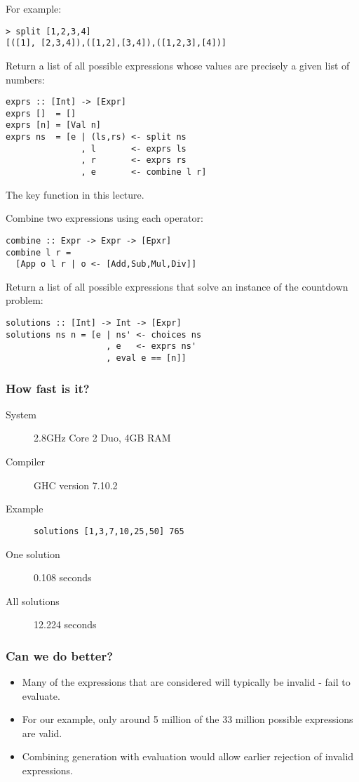 \begin{multicols}{2}
For example:
\begin{lstlisting}
> split [1,2,3,4]
[([1], [2,3,4]),([1,2],[3,4]),([1,2,3],[4])]
\end{lstlisting}

Return a list of all possible expressions whose values are precisely a given list of numbers:
\begin{lstlisting}
exprs :: [Int] -> [Expr]
exprs []  = []
exprs [n] = [Val n]
exprs ns  = [e | (ls,rs) <- split ns
               , l       <- exprs ls
               , r       <- exprs rs
               , e       <- combine l r]
\end{lstlisting}
The key function in this lecture.

Combine two expressions using each operator:
\begin{lstlisting}
combine :: Expr -> Expr -> [Epxr]
combine l r =
  [App o l r | o <- [Add,Sub,Mul,Div]]
\end{lstlisting}

Return a list of all possible expressions that solve an instance of the countdown problem:
\begin{lstlisting}
solutions :: [Int] -> Int -> [Expr]
solutions ns n = [e | ns' <- choices ns
                    , e   <- exprs ns'
                    , eval e == [n]]
\end{lstlisting}

\subsubsection{How fast is it?}
\begin{description}
  \item[System] 2.8GHz Core 2 Duo, 4GB RAM
  \item[Compiler] GHC version 7.10.2
  \item[Example] \lstinline{solutions [1,3,7,10,25,50] 765}
  \item[One solution] 0.108 seconds
  \item[All solutions] 12.224 seconds     
\end{description}

\subsubsection{Can we do better?}
\begin{itemize}
  \item Many of the expressions that are considered will typically be invalid - fail to evaluate.
  \item For our example, only around 5 million of the 33 million possible expressions are valid.
  \item Combining generation with evaluation would allow earlier rejection of invalid expressions.
\end{itemize}


\end{multicols}
